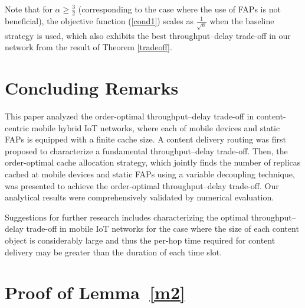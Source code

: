\documentclass[10pt,journal,compsoc,onecolumn]{IEEEtran}
\begin{document}
Note that for $\alpha\geq\frac{3}{2}$ (corresponding to the case
where the use of FAPs is not beneficial), the objective function
(\ref{cond1}) scales as $\frac{1}{\sqrt{n}}$ when the baseline
strategy is used, which also exhibits the best throughput--delay
trade-off in our network from the result of Theorem
\ref{tradeoff}.

\section{Concluding Remarks}
This paper analyzed the order-optimal throughput--delay trade-off in
content-centric mobile hybrid IoT networks, where each of mobile devices
and static FAPs is equipped with a finite cache size. A content
delivery routing was first proposed to characterize a fundamental
throughput--delay trade-off. Then, the order-optimal cache allocation
strategy, which jointly finds the number of replicas cached at
mobile devices and static FAPs using a variable decoupling technique, was
presented to achieve the order-optimal throughput--delay trade-off. Our
analytical results were comprehensively validated by numerical
evaluation.

Suggestions for further research includes characterizing the
optimal throughput--delay trade-off in mobile IoT networks for
the case where the size of each content object is considerably
large and thus the per-hop time required for content delivery may
be greater than the duration of each time slot.

\appendices
\renewcommand\theequation{\Alph{section}.\arabic{equation}}
\setcounter{equation}{0}

\section{Proof of Lemma~\ref{m2}}\label{PF:Lemma2}
\end{document}
